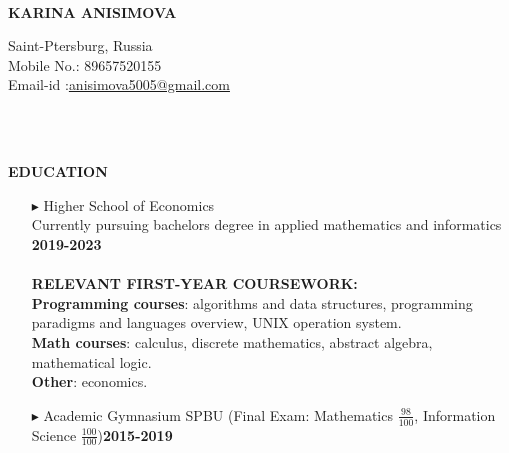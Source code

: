 \documentclass[a4paper,10pt]{article}
\begin{document}
	\hspace{0.5cm}\\[-0.2cm]
	\begin{minipage}{0.5\textwidth}
		\begin{flushleft}
			\huge \textbf{\* \* KARINA ANISIMOVA} 
			\normalsize
		\end{flushleft}
	\end{minipage}
	\begin{minipage}{0.51\textwidth}
		\begin{flushright}
			\textcolor[gray]{0.3}{
				\indent Saint-Ptersburg, Russia\\
				\indent Mobile No.: 89657520155  \\
				\indent Email-id :\href{mailto:anisimova5005@gmail.com} {anisimova5005@gmail.com}\\  	
			}
		\end{flushright}
	\end{minipage}
	\\ \\
	
	
	
	\colorbox{magicmint}{
		\begin{minipage}{0.96\textwidth}
			\textbf{EDUCATION}
		\end{minipage}
	}
	
	\begin{itemize}
		\item [$\blacktriangleright$]  Higher School of Economics\\ Currently pursuing bachelors degree in applied mathematics and informatics \hspace{2.8cm} \textbf{2019-2023} \\ \\
		\textbf{RELEVANT FIRST-YEAR COURSEWORK:}\\
		\textbf{Programming courses}{: algorithms and data structures, programming paradigms and languages overview, UNIX operation system.}\\
		\textbf{Math courses}{: calculus, discrete mathematics, abstract algebra, mathematical logic.}\\
		\textbf{Other}{: economics.}
		\item[$\blacktriangleright$]  Academic Gymnasium SPBU (Final Exam: Mathematics $\frac{98}{100}$, Information Science $\frac{100}{100}$)\hspace{1.7cm}\textbf{2015-2019}
	\end{itemize}
	
\end{document}
